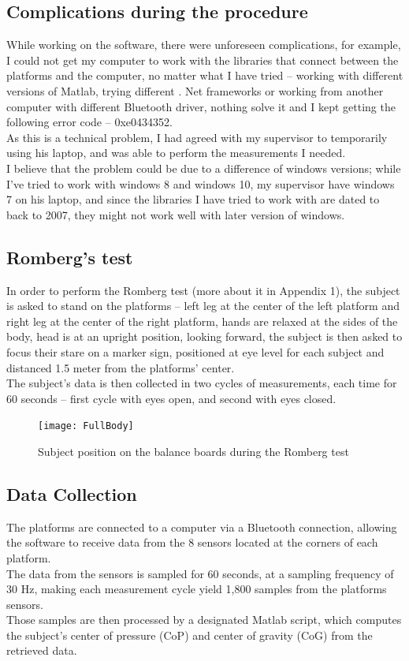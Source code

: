 \documentclass[twoside]{ctuthesis}
\theoremstyle{plain}
\theoremstyle{definition}
\theoremstyle{note}
\begin{document}
\subsection{Complications during the procedure}
While working on the software, there were unforeseen complications, for example, I could not get my computer to work with the libraries that connect between the platforms and the computer, no matter what I have tried – working with different versions of Matlab, trying different . Net frameworks or working from another computer with different Bluetooth driver, nothing solve it and I kept getting the following error code – 0xe0434352.\\
As this is a technical problem, I had agreed with my supervisor to temporarily using his laptop, and was able to perform the measurements I needed.\\
I believe that the problem could be due to a difference of windows versions; while I've tried to work with windows 8 and windows 10, my supervisor have windows 7 on his laptop, and since the libraries I have tried to work with are dated to back to 2007\cite{Error}, they might not work well with later version of windows.

\subsection{Romberg's test}
In order to perform the Romberg test (more about it in Appendix 1), the subject is asked to stand on the platforms – left leg at the center of the left platform and right leg at the center of the right platform, hands are relaxed at the sides of the body, head is at an upright position, looking forward, the subject is then asked to focus their stare on a marker sign, positioned at eye level for each subject and distanced 1.5 meter from the platforms' center.\\
The subject's data is then collected in two cycles of measurements, each time for 60 seconds – first cycle with eyes open, and second with eyes closed.\\

\begin{figure}[H]
	\centering
	\texttt{[image: FullBody]}
	\caption{Subject position on the balance boards during the Romberg test}
\end{figure}

\subsection{Data Collection}
The platforms are connected to a computer via a Bluetooth connection, allowing the software to receive data from the 8 sensors located at the corners of each platform.\\
The data from the sensors is sampled for 60 seconds, at a sampling frequency of 30 Hz, making each measurement cycle yield 1,800 samples from the platforms sensors.\\ 
Those samples are then processed by a designated Matlab script, which computes the subject's center of pressure (CoP) and center of gravity (CoG) from the retrieved data.
\end{document}
